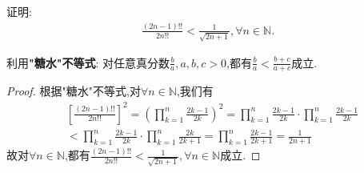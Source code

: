 \documentclass[../../main.tex]{subfiles}%
\begin{document}
\begin{example}
证明:\begin{align*}
\frac{\left( 2n-1 \right) !!}{2n!!}<\frac{1}{\sqrt{2n+1}},\forall n\in \mathbb{N} .
\end{align*}
\end{example}
\begin{note}
利用\hypertarget{"糖水"不等式}{\textbf{"糖水"不等式}}:
对任意真分数$\frac{b}{a},a,b,c>0$,都有$\frac{b}{a}<\frac{b+c}{a+c}$成立.
\end{note}
\begin{proof}
根据\hypertarget{"糖水"不等式}{"糖水"不等式},对$\forall n\in \mathbb{N}$,我们有
\begin{align*}
&\left[ \frac{\left( 2n-1 \right) !!}{2n!!} \right] ^2=\left( \prod_{k=1}^n{\frac{2k-1}{2k}} \right) ^2=\prod_{k=1}^n{\frac{2k-1}{2k}}\cdot \prod_{k=1}^n{\frac{2k-1}{2k}}
\\
&<\prod_{k=1}^n{\frac{2k-1}{2k}}\cdot \prod_{k=1}^n{\frac{2k}{2k+1}}=\prod_{k=1}^n{\frac{2k-1}{2k+1}}=\frac{1}{2n+1}
\end{align*}
故对$\forall n\in \mathbb{N}$,都有$\frac{\left( 2n-1 \right) !!}{2n!!}<\frac{1}{\sqrt{2n+1}},\forall n\in \mathbb{N}$成立.
\end{proof}
\end{document}
